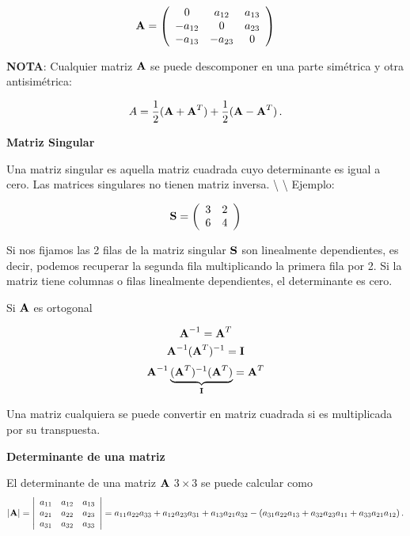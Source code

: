 \documentclass[
]{agujournal2019}
\begin{document}
\[{\textbf A}=\left(\begin{array}{cccc}
  0 & a_{12} & a_{13}\\
  -a_{12} & 0 & a_{23}\\
  -a_{13} & -a_{23} & 0\\
\end{array}\right)
\]

\textbf{NOTA}: Cualquier matriz \({\textbf A}\) se puede descomponer en
una parte simétrica y otra antisimétrica:

\[A=\frac{1}{2}({\textbf A}+{\textbf A}^T) + \frac{1}{2}({\textbf A}-{\textbf A}^T)\,.\]

\vspace{0.5cm}

\textbf{Matriz Singular}

Una matriz singular es aquella matriz cuadrada cuyo determinante es
igual a cero. Las matrices singulares no tienen matriz inversa.
\textbackslash{} \textbackslash{} Ejemplo:

\[{\textbf S}=\left(\begin{array}{cc}
  3 & 2\\
  6 & 4
\end{array}\right)
\]

Si nos fijamos las 2 filas de la matriz singular \({\textbf S}\) son
linealmente dependientes, es decir, podemos recuperar la segunda fila
multiplicando la primera fila por 2. Si la matriz tiene columnas o filas
linealmente dependientes, el determinante es cero.

Si \({\textbf A}\) es ortogonal

\[{\textbf A}^{-1}={\textbf A}^T\]
\[{\textbf A}^{-1}({\textbf A}^T)^{-1}={\textbf I}\]
\[{\textbf A}^{-1}\underbrace{({\textbf A}^T)^{-1}({\textbf A}^T)}_{{\textbf I}}={\textbf A}^T\]

Una matriz cualquiera se puede convertir en matriz cuadrada si es
multiplicada por su transpuesta.

\vspace{0.5cm}

\textbf{Determinante de una matriz}

El determinante de una matriz \({\textbf A}\) \(3\times 3\) se puede
calcular como \[|{\textbf A}|=\left|\begin{array}{cccc}
  a_{11} & a_{12} & a_{13}\\
  a_{21} & a_{22} & a_{23}\\
  a_{31} & a_{32} & a_{33}\\
\end{array}
  \right|=a_{11}a_{22}a_{33} + a_{12}a_{23}a_{31} + a_{13}a_{21}a_{32}-(a_{31}a_{22}a_{13} + a_{32}a_{23}a_{11} +
          a_{33}a_{21}a_{12})\,.\]
\end{document}
